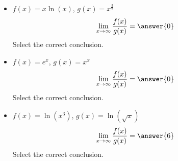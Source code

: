 \documentclass{ximera}
\begin{document}
\begin{exercise}
\begin{itemize}
\item $f(x)=x\ln(x)$, $g(x)=x^{\frac{3}{2}}$
\[
\lim_{x\to\infty}\frac{f(x)}{g(x)} = \answer{0}
\]
Select the correct conclusion.
\begin{multipleChoice}
\end{multipleChoice}

\item $f(x)=e^x$, $g(x)=x^x$
\[
\lim_{x\to\infty}\frac{f(x)}{g(x)} = \answer{0}
\]
Select the correct conclusion.
\begin{multipleChoice}
\end{multipleChoice}

\item $f(x)=\ln(x^3)$, $g(x)=\ln(\sqrt{x})$
\[
\lim_{x\to\infty}\frac{f(x)}{g(x)} = \answer{6}
\]
Select the correct conclusion.
\begin{multipleChoice}
\end{multipleChoice}

\end{itemize}

\end{exercise}
\end{document}
